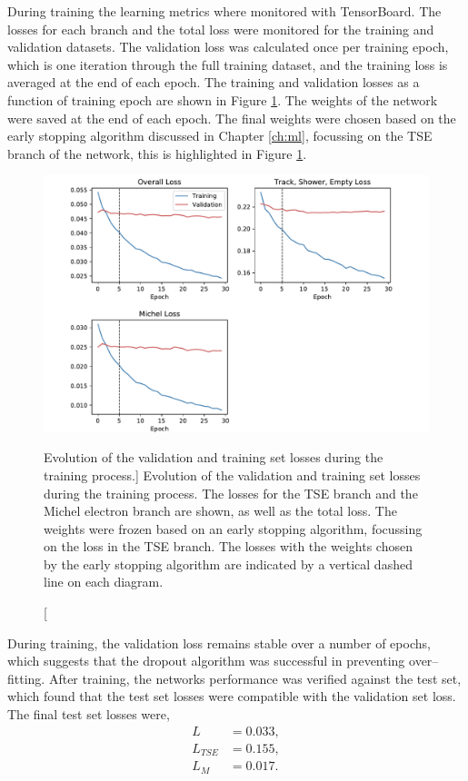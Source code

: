 During training the learning metrics where monitored with TensorBoard. The
losses for each branch and the total loss were monitored for the training
and validation datasets. The validation loss was calculated once per training
epoch, which is one iteration through the full training dataset, and the
training loss is averaged at the end of each epoch. The training and validation
losses as a function of training epoch are shown in Figure \ref{fig:training}.
The weights of the network were saved at the end of each epoch. The final
weights were chosen based on the early stopping algorithm discussed in Chapter
\ref{ch:ml}, focussing on the TSE branch of the network, this is highlighted 
in Figure \ref{fig:training}.
\begin{figure}
	\centering
	\includegraphics[width=\textwidth]{figures/losses_prelu.pdf}
	\caption
	[Evolution of the validation and training set losses during the training 
	process.]
	{Evolution of the validation and training set losses during the training 
	process. The losses for the TSE branch and the Michel electron branch are
	shown, as well as the total loss. The weights were frozen based on an early 
	stopping algorithm, focussing on the loss in the TSE branch. The losses with
	the weights chosen by the early stopping algorithm are indicated by a vertical
	dashed line on each diagram.} 
	\label{fig:training}
\end{figure}

During training, the validation loss remains stable over a number of epochs,
which suggests that the dropout algorithm was successful in preventing 
over--fitting. After training, the networks performance was verified against 
the test set, which found that the test set losses were compatible with the 
validation set loss. The final test set losses were, 
\begin{align*}
	L &       = 0.033, \\
	L_{TSE} & = 0.155, \\
	L_M &     = 0.017.
\end{align*}

